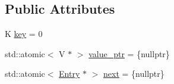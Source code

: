 \subsection*{Public Attributes}
\begin{DoxyCompactItemize}
\item 
K \hyperlink{structapollo_1_1cyber_1_1base_1_1AtomicHashMap_1_1Entry_a92d89dfd94973438aa8db43a8bbebee6}{key} = 0
\item 
std\-::atomic$<$ V $\ast$ $>$ \hyperlink{structapollo_1_1cyber_1_1base_1_1AtomicHashMap_1_1Entry_ac717cbc0d8b0e10085e6458790f2a30f}{value\-\_\-ptr} = \{nullptr\}
\item 
std\-::atomic$<$ \hyperlink{structapollo_1_1cyber_1_1base_1_1AtomicHashMap_1_1Entry}{Entry} $\ast$ $>$ \hyperlink{structapollo_1_1cyber_1_1base_1_1AtomicHashMap_1_1Entry_af0f925e9c620cb000999d0dafd872e0f}{next} = \{nullptr\}
\end{DoxyCompactItemize}


